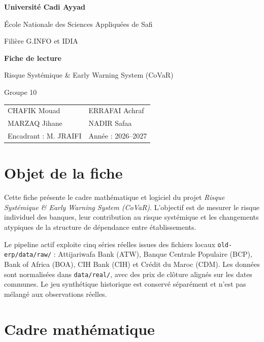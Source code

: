 \documentclass[12pt,a4paper]{article}
\begin{document}
\begin{titlepage}
  \centering
  \vspace*{1cm}
  {\Large \textbf{Université Cadi Ayyad}\par}
  \vspace{0.3cm}
  {\large École Nationale des Sciences Appliquées de Safi\par}
  \vspace{0.3cm}
  {\large Filière G.INFO et IDIA\par}
  \vfill
  {\Huge \textbf{Fiche de lecture}\par}
  \vspace{0.5cm}
  {\LARGE Risque Systémique \& Early Warning System (CoVaR)\par}
  \vspace{0.8cm}
  {\large Groupe 10\par}
  \vfill
  \begin{tabular}{ll}
    CHAFIK Mouad & ERRAFAI Achraf \\
    MARZAQ Jihane & NADIR Safaa \\
    Encadrant : M. JRAIFI & Année : 2026--2027
  \end{tabular}
  \vfill
\end{titlepage}

\tableofcontents
\clearpage

\section{Objet de la fiche}

Cette fiche présente le cadre mathématique et logiciel du projet
\emph{Risque Systémique \& Early Warning System (CoVaR)}. L'objectif est de mesurer le risque
individuel des banques, leur contribution au risque systémique et les changements atypiques de
la structure de dépendance entre établissements.

Le pipeline actif exploite cinq séries réelles issues des fichiers locaux
\texttt{old-erp/data/raw/} : Attijariwafa Bank (ATW), Banque Centrale Populaire (BCP), Bank of
Africa (BOA), CIH Bank (CIH) et Crédit du Maroc (CDM). Les données sont normalisées dans
\texttt{data/real/}, avec des prix de clôture alignés sur les dates communes. Le jeu synthétique
historique est conservé séparément et n'est pas mélangé aux observations réelles.

\section{Cadre mathématique}
\end{document}
